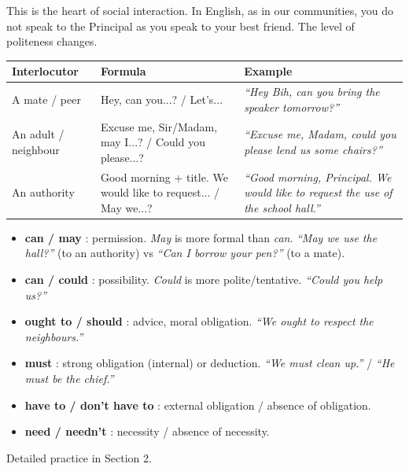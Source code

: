 \documentclass[11pt]{article}
\begin{document}
This is the heart of social interaction. In English, as in our communities, you do not speak to the Principal as you speak to your best friend. The level of politeness changes.

\begin{center}
\begin{tabularx}{\linewidth}{|l|X|X|}\hline
\rowcolor{poppurpleL} \textbf{Interlocutor} & \textbf{Formula} & \textbf{Example} \\ \hline
A mate / peer & Hey, can you...? / Let's... & \emph{``Hey Bih, can you bring the speaker tomorrow?''} \\ \hline
An adult / neighbour & Excuse me, Sir/Madam, may I...? / Could you please...? & \emph{``Excuse me, Madam, could you please lend us some chairs?''} \\ \hline
An authority & Good morning + title. We would like to request... / May we...? & \emph{``Good morning, Principal. We would like to request the use of the school hall.''} \\ \hline
\end{tabularx}
\end{center}

\begin{propriete}
\begin{itemize}
\item \textbf{can / may} : permission. \emph{May} is more formal than \emph{can}. \emph{``May we use the hall?''} (to an authority) vs \emph{``Can I borrow your pen?''} (to a mate).
\item \textbf{can / could} : possibility. \emph{Could} is more polite/tentative. \emph{``Could you help us?''}
\item \textbf{ought to / should} : advice, moral obligation. \emph{``We ought to respect the neighbours.''}
\item \textbf{must} : strong obligation (internal) or deduction. \emph{``We must clean up.''} / \emph{``He must be the chief.''}
\item \textbf{have to / don't have to} : external obligation / absence of obligation.
\item \textbf{need / needn't} : necessity / absence of necessity.
\end{itemize}
Detailed practice in Section 2.
\end{propriete}
\end{document}
